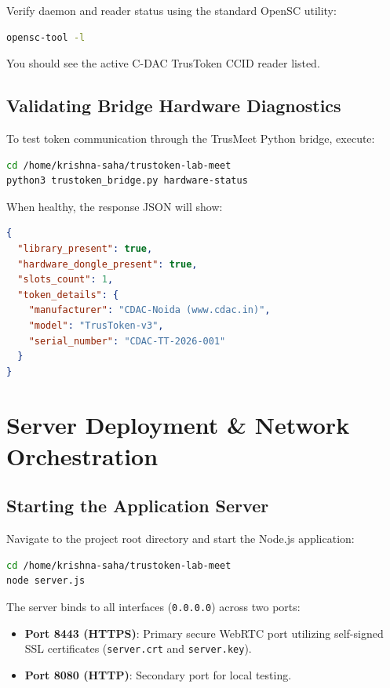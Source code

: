 \documentclass[11pt,a4paper]{report}
\begin{document}
Verify daemon and reader status using the standard OpenSC utility:
\begin{lstlisting}[language=bash]
opensc-tool -l
\end{lstlisting}
You should see the active C-DAC TrusToken CCID reader listed.

\section{Validating Bridge Hardware Diagnostics}
To test token communication through the TrusMeet Python bridge, execute:
\begin{lstlisting}[language=bash]
cd /home/krishna-saha/trustoken-lab-meet
python3 trustoken_bridge.py hardware-status
\end{lstlisting}
When healthy, the response JSON will show:
\begin{lstlisting}[language=json]
{
  "library_present": true,
  "hardware_dongle_present": true,
  "slots_count": 1,
  "token_details": {
    "manufacturer": "CDAC-Noida (www.cdac.in)",
    "model": "TrusToken-v3",
    "serial_number": "CDAC-TT-2026-001"
  }
}
\end{lstlisting}

\newpage
\chapter{Server Deployment \& Network Orchestration}

\section{Starting the Application Server}
Navigate to the project root directory and start the Node.js application:
\begin{lstlisting}[language=bash]
cd /home/krishna-saha/trustoken-lab-meet
node server.js
\end{lstlisting}

The server binds to all interfaces (\texttt{0.0.0.0}) across two ports:
\begin{itemize}[noitemsep]
    \item \textbf{Port 8443 (HTTPS)}: Primary secure WebRTC port utilizing self-signed SSL certificates (\texttt{server.crt} and \texttt{server.key}).
    \item \textbf{Port 8080 (HTTP)}: Secondary port for local testing.
\end{itemize}
\end{document}
